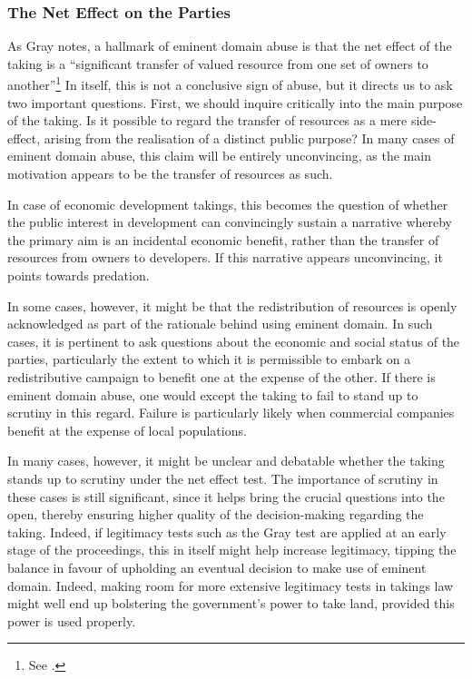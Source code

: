 \subsubsection*{The Net Effect on the Parties}

As Gray notes, a hallmark of eminent domain abuse is that the net effect of the taking is a ``significant transfer of valued resource from one set of owners to another''\footnote{See \cite[31]{gray11}.} In itself, this is not a conclusive sign of abuse, but it directs us to ask two important questions. First, we should inquire critically into the main purpose of the taking. Is it possible to regard the transfer of resources as a mere side-effect, arising from the realisation of a distinct public purpose? In many cases of eminent domain abuse, this claim will be entirely unconvincing, as the main motivation appears to be the transfer of resources as such.

In case of economic development takings, this becomes the question of whether the public interest in development can convincingly sustain a narrative whereby the primary aim is an incidental economic benefit, rather than the transfer of resources from owners to developers. If this narrative appears unconvincing, it points towards predation.

In some cases, however, it might be that the redistribution of resources is openly acknowledged as part of the rationale behind using eminent domain. In such cases, it is pertinent to ask questions about the  economic and social status of the parties, particularly the extent to which it is permissible to embark on a redistributive campaign to benefit one at the expense of the other. If there is eminent domain abuse, one would except the taking to fail to stand up to scrutiny in this regard. Failure is particularly likely when commercial companies benefit at the expense of local populations. 

In many cases, however, it might be unclear and debatable whether the taking stands up to scrutiny under the net effect test. The importance of scrutiny in these cases is still significant, since it helps bring the crucial questions into the open, thereby ensuring higher quality of the decision-making regarding the taking. Indeed, if legitimacy tests such as the Gray test are applied at an early stage of the proceedings, this in itself might help increase legitimacy, tipping the balance in favour of upholding an eventual decision to make use of eminent domain. Indeed, making room for more extensive  legitimacy tests in takings law might well end up bolstering the government's power to take land, provided this power is used properly.

